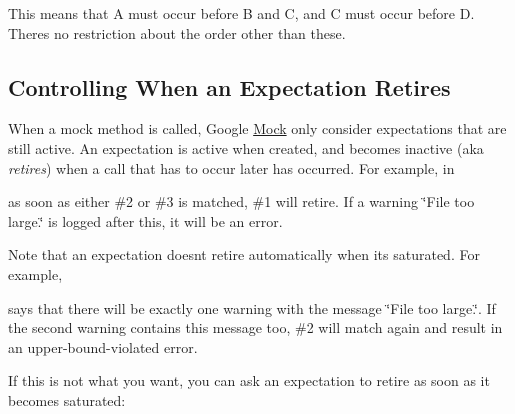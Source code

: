 This means that A must occur before B and C, and C must occur before D. There\textquotesingle{}s no restriction about the order other than these.

\subsection*{Controlling When an Expectation Retires}

When a mock method is called, Google \hyperlink{classMock}{Mock} only consider expectations that are still active. An expectation is active when created, and becomes inactive (aka {\itshape retires}) when a call that has to occur later has occurred. For example, in




as soon as either \#2 or \#3 is matched, \#1 will retire. If a warning {\ttfamily \char`\"{}\+File too large.\char`\"{}} is logged after this, it will be an error.

Note that an expectation doesn\textquotesingle{}t retire automatically when it\textquotesingle{}s saturated. For example,




says that there will be exactly one warning with the message {\ttfamily \char`\"{}\+File
too large.\char`\"{}}. If the second warning contains this message too, \#2 will match again and result in an upper-\/bound-\/violated error.

If this is not what you want, you can ask an expectation to retire as soon as it becomes saturated\+:




